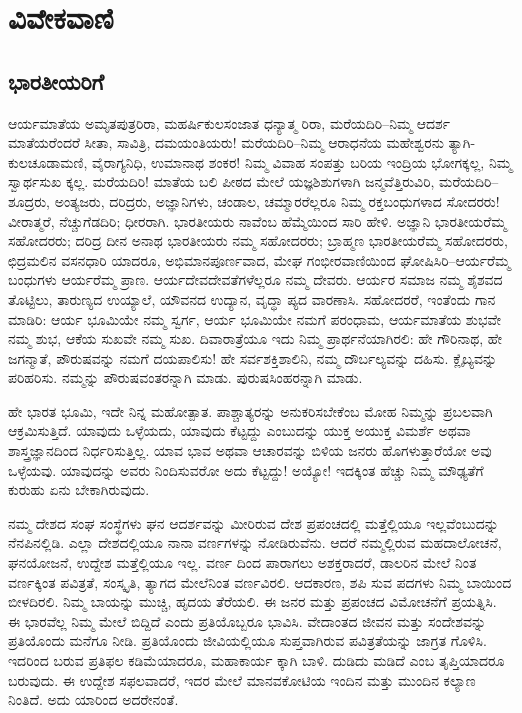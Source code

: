 
\chapter{ವಿವೇಕವಾಣಿ}

\section{ಭಾರತೀಯರಿಗೆ}

ಆರ್ಯಮಾತೆಯ ಅಮೃತಪುತ್ರರಿರಾ, ಮಹರ್ಷಿಕುಲಸಂಜಾತ ಧನ್ಯಾತ್ಮ ರಿರಾ, ಮರೆಯದಿರಿ–ನಿಮ್ಮ ಆದರ್ಶ ಮಾತೆಯರೆಂದರೆ ಸೀತಾ, ಸಾವಿತ್ರಿ, ದಮಯಂತಿಯರು! ಮರೆಯದಿರಿ–ನಿಮ್ಮ ಆರಾಧನೆಯ ಮಹೇಶ್ವರನು ತ್ಯಾಗಿ-ಕುಲಚೂಡಾಮಣಿ, ವೈರಾಗ್ಯನಿಧಿ, ಉಮಾನಾಥ ಶಂಕರ! ನಿಮ್ಮ ವಿವಾಹ ಸಂಪತ್ತು ಬರಿಯ ಇಂದ್ರಿಯ ಭೋಗಕ್ಕಲ್ಲ, ನಿಮ್ಮ ಸ್ವಾರ್ಥಸುಖ ಕ್ಕಲ್ಲ. ಮರೆಯದಿರಿ! ಮಾತೆಯ ಬಲಿ ಪೀಠದ ಮೇಲೆ ಯಜ್ಞಶಿಶುಗಳಾಗಿ ಜನ್ಮವೆತ್ತಿರುವಿರಿ, ಮರೆಯದಿರಿ–ಶೂದ್ರರು, ಅಂತ್ಯಜರು, ದರಿದ್ರರು, ಅಜ್ಞಾನಿಗಳು, ಚಂಡಾಲ, ಚಮ್ಮಾರರೆಲ್ಲರೂ ನಿಮ್ಮ ರಕ್ತಬಂಧುಗಳಾದ ಸೋದರರು! ವೀರಾತ್ಮರೆ, ನೆಚ್ಚುಗೆಡದಿರಿ; ಧೀರರಾಗಿ. ಭಾರತೀಯರು ನಾವೆಂಬ ಹೆಮ್ಮೆಯಿಂದ ಸಾರಿ ಹೇಳಿ. ಅಜ್ಞಾನಿ ಭಾರತೀಯರೆಮ್ಮ ಸಹೋದರರು; ದರಿದ್ರ ದೀನ ಅನಾಥ ಭಾರತೀಯರು ನಮ್ಮ ಸಹೋದರರು; ಬ್ರಾಹ್ಮಣ ಭಾರತೀಯರೆಮ್ಮ ಸಹೋದರರು, ಛಿದ್ರಮಲಿನ ವಸನಧಾರಿ ಯಾದರೂ, ಅಭಿಮಾನಪೂರ್ಣವಾದ, ಮೇಘ ಗಂಭೀರವಾಣಿಯಿಂದ ಘೋಷಿಸಿರಿ–ಆರ್ಯರೆಮ್ಮ ಬಂಧುಗಳು ಆರ್ಯರೆಮ್ಮ ಪ್ರಾಣ. ಆರ್ಯದೇವದೇವತೆಗಳೆಲ್ಲರೂ ನಮ್ಮ ದೇವರು. ಆರ್ಯರ ಸಮಾಜ ನಮ್ಮ ಶೈಶವದ ತೊಟ್ಟಿಲು, ತಾರುಣ್ಯದ ಉಯ್ಯಾಲೆ, ಯೌವನದ ಉದ್ಯಾನ, ವೃದ್ಧಾ ಪ್ಯದ ವಾರಣಾಸಿ. ಸಹೋದರರೆ, ಇಂತೆಂದು ಗಾನ ಮಾಡಿರಿ: ಆರ್ಯ ಭೂಮಿಯೇ ನಮ್ಮ ಸ್ವರ್ಗ, ಆರ್ಯ ಭೂಮಿಯೇ ನಮಗೆ ಪರಂಧಾಮ, ಆರ್ಯಮಾತೆಯ ಶುಭವೇ ನಮ್ಮ ಶುಭ, ಆಕೆಯ ಸುಖವೇ ನಮ್ಮ ಸುಖ. ದಿವಾರಾತ್ರೆಯೂ ಇದು ನಿಮ್ಮ ಪ್ರಾರ್ಥನೆಯಾಗಿರಲಿ: ಹೇ ಗೌರಿನಾಥ, ಹೇ ಜಗನ್ಮಾತೆ, ಪೌರುಷವನ್ನು ನಮಗೆ ದಯಪಾಲಿಸು! ಹೇ ಸರ್ವಶಕ್ತಿಶಾಲಿನಿ, ನಮ್ಮ ದೌರ್ಬಲ್ಯವನ್ನು ದಹಿಸು. ಕ್ಲೈಬ್ಯವನ್ನು ಪರಿಹರಿಸು. ನಮ್ಮನ್ನು ಪೌರುಷವಂತರನ್ನಾಗಿ ಮಾಡು. ಪುರುಷಸಿಂಹರನ್ನಾಗಿ ಮಾಡು.

ಹೇ ಭಾರತ ಭೂಮಿ, ಇದೇ ನಿನ್ನ ಮಹೋತ್ಪಾತ. ಪಾಶ್ಚಾತ್ಯರನ್ನು ಅನುಕರಿಸಬೇಕೆಂಬ ಮೋಹ ನಿಮ್ಮನ್ನು ಪ್ರಬಲವಾಗಿ ಆಕ್ರಮಿಸುತ್ತಿದೆ. ಯಾವುದು ಒಳ್ಳೆಯದು, ಯಾವುದು ಕೆಟ್ಟದ್ದು ಎಂಬುದನ್ನು ಯುಕ್ತ ಅಯುಕ್ತ ವಿಮರ್ಶೆ ಅಥವಾ ಶಾಸ್ತ್ರಜ್ಞಾನದಿಂದ ನಿರ್ಧರಿಸುತ್ತಿಲ್ಲ. ಯಾವ ಭಾವ ಅಥವಾ ಆಚಾರವನ್ನು ಬಿಳಿಯ ಜನರು ಹೊಗಳುತ್ತಾರೆಯೋ ಅವು ಒಳ್ಳೆಯವು. ಯಾವುದನ್ನು ಅವರು ನಿಂದಿಸುವರೋ ಅದು ಕೆಟ್ಟದ್ದು! ಅಯ್ಯೋ! ಇದಕ್ಕಿಂತ ಹೆಚ್ಚು ನಿಮ್ಮ ಮೌಢ್ಯತೆಗೆ ಕುರುಹು ಏನು ಬೇಕಾಗಿರುವುದು. 

ನಮ್ಮ ದೇಶದ ಸಂಘ ಸಂಸ್ಥೆಗಳು ಘನ ಆದರ್ಶವನ್ನು ಮೀರಿರುವ ದೇಶ ಪ್ರಪಂಚದಲ್ಲಿ ಮತ್ತೆಲ್ಲಿಯೂ ಇಲ್ಲವೆಂಬುದನ್ನು ನೆನಪಿನಲ್ಲಿಡಿ. ಎಲ್ಲಾ ದೇಶದಲ್ಲಿಯೂ ನಾನಾ ವರ್ಣಗಳನ್ನು ನೋಡಿರುವೆನು. ಆದರೆ ನಮ್ಮಲ್ಲಿರುವ ಮಹದಾಲೋಚನೆ, ಘನಯೋಜನೆ, ಉದ್ದೇಶ ಮತ್ತೆಲ್ಲಿಯೂ ಇಲ್ಲ. ವರ್ಣ ದಿಂದ ಪಾರಾಗಲು ಅಶಕ್ತರಾದರೆ, ಡಾಲರಿನ ಮೇಲೆ ನಿಂತ ವರ್ಣಕ್ಕಿಂತ ಪವಿತ್ರತೆ, ಸಂಸ್ಕೃತಿ, ತ್ಯಾಗದ ಮೇಲೆನಿಂತ ವರ್ಣವಿರಲಿ. ಆದಕಾರಣ, ಶಪಿ ಸುವ ಪದಗಳು ನಿಮ್ಮ ಬಾಯಿಂದ ಬೀಳದಿರಲಿ. ನಿಮ್ಮ ಬಾಯನ್ನು ಮುಚ್ಚಿ, ಹೃದಯ ತೆರೆಯಲಿ. ಈ ಜನರ ಮತ್ತು ಪ್ರಪಂಚದ ವಿಮೋಚನೆಗೆ ಪ್ರಯತ್ನಿಸಿ. ಈ ಭಾರವೆಲ್ಲ ನಿಮ್ಮ ಮೇಲೆ ಬಿದ್ದಿದೆ ಎಂದು ಪ್ರತಿಯೊಬ್ಬರೂ ಭಾವಿಸಿ. ವೇದಾಂತದ ಜೀವನ ಮತ್ತು ಸಂದೇಶವನ್ನು ಪ್ರತಿಯೊಂದು ಮನೆಗೂ ನೀಡಿ. ಪ್ರತಿಯೊಂದು ಜೀವಿಯಲ್ಲಿಯೂ ಸುಪ್ತವಾಗಿರುವ ಪವಿತ್ರತೆಯನ್ನು ಜಾಗ್ರತ ಗೊಳಿಸಿ. ಇದರಿಂದ ಬರುವ ಪ್ರತಿಫಲ ಕಡಿಮೆಯಾದರೂ, ಮಹಾಕಾರ್ಯ ಕ್ಕಾಗಿ ಬಾಳಿ. ದುಡಿದು ಮಡಿದೆ ಎಂಬ ತೃಪ್ತಿಯಾದರೂ ಬರುವುದು. ಈ ಉದ್ದೇಶ ಸಫಲವಾದರೆ, ಇದರ ಮೇಲೆ ಮಾನವಕೋಟಿಯ ಇಂದಿನ ಮತ್ತು ಮುಂದಿನ ಕಲ್ಯಾಣ ನಿಂತಿದೆ. ಅದು ಯಾರಿಂದ ಅದರೇನಂತೆ.

